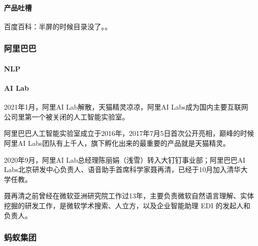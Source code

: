 \documentclass[letterpaper,10pt,english]{sphinxmanual}
\begin{document}
\paragraph{产品吐槽}
\label{\detokenize{chapter_AI_company/baidu:id4}}
百度百科：半屏的时候目录没了。。%
\begin{footnote}[987]\sphinxAtStartFootnote
{}
%
\end{footnote}


\subsubsection{阿里巴巴}
\label{\detokenize{chapter_AI_company/alibaba:id1}}\label{\detokenize{chapter_AI_company/alibaba::doc}}

\paragraph{NLP}
\label{\detokenize{chapter_AI_company/alibaba:nlp}}


\paragraph{AI Lab}
\label{\detokenize{chapter_AI_company/alibaba:ai-lab}}
2021年1月，阿里AI Lab解散，天猫精灵凉凉，阿里AI
Labs成为国内主要互联网公司里第一个被关闭的人工智能实验室。

阿里巴巴人工智能实验室成立于2016年，2017年7月5日首次公开亮相，巅峰的时候阿里AI
Labs团队有上千人，旗下孵化出来的最重要的产品就是天猫精灵。

2020年9月，阿里AI Lab总经理陈丽娟（浅雪）转入大钉钉事业部；阿里巴巴AI
Labs北京研发中心负责人、语音助手首席科学家聂再清，已经于10月加入清华大学任教。

聂再清之前曾经在微软亚洲研究院工作过13年，主要负责微软自然语言理解、实体挖掘的研发工作，是微软学术搜索、人立方，以及企业智能助理
EDI 的发起人和负责人。


\subsubsection{蚂蚁集团}
\label{\detokenize{chapter_AI_company/antgroup:id1}}\label{\detokenize{chapter_AI_company/antgroup::doc}}
\end{document}
